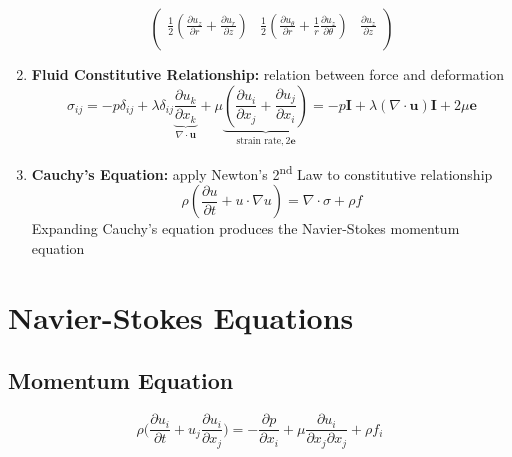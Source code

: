 \documentclass{article}
\begin{document}
\begin{enumerate}
\begin{equation*}
\begin{pmatrix}
          \frac{1}{2}(\frac{\partial u_{z}}{\partial r}+\frac{\partial u_{r}}{\partial z}) & \frac{1}{2}(\frac{\partial u_{\theta}}{\partial r}+\frac{1}{r}\frac{\partial u_{z}}{\partial \theta})  & \frac{\partial u_{z}}{\partial z}\\
          \end{pmatrix}
      \end{equation*}

    \item \textbf{Fluid Constitutive Relationship:} relation between force and deformation
      \[ \sigma_{ij} = -p\delta_{ij} + \lambda \delta_{ij} \underbrace{\frac{\partial u_{k}}{\partial x_{k}}}_{\nabla \cdot \mathbf{u}} + \mu \underbrace{(\frac{\partial u_{i}}{\partial x_{j}} + \frac{\partial u_{j}}{\partial x_{i}})}_{\text{strain rate}, 2\mathbf{e}} = -p\mathbf{I} + \lambda (\nabla \cdot \mathbf{u})\mathbf{I} + 2\mu \mathbf{e}\]
      
    \item \textbf{Cauchy's Equation:} apply Newton's 2\textsuperscript{nd} Law to constitutive relationship
      \[  \rho (\frac{\partial u}{\partial t} + u \cdot \nabla u) = \nabla \cdot \sigma + \rho f \]
      Expanding Cauchy's equation produces the Navier-Stokes momentum equation
\end{enumerate}


\section{Navier-Stokes Equations}

    \subsection{Momentum Equation}
        \[\rho \bigg( \frac{\partial u_{i}}{\partial t} + u_{j}\frac{\partial u_{i}}{\partial x_{j}} \bigg) = -\frac{\partial p}{\partial x_{i}} + \mu \frac{\partial u_{i}}{\partial x_{j}\partial x_{j}} + \rho f_{i}\]
\end{document}
